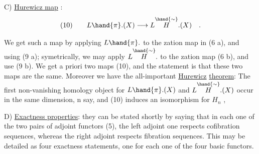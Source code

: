 C) \uline{Hurewicz map} :
\[
(10)\qquad L\hand{\pi}.(X) \longrightarrow L\overset{\hand{\sim}}{H}.(X) \quad .
\]

We get such a map by applying $L\hand{\pi}.$ to the zation map in
(6 a), and using (9 a); symetrically, we may apply $L\overset{\hand{\sim}}{H}.$ to the
zation map (6 b), and use (9 b). We get a priori two maps
(10), and the statement is that these two maps are the same. Moreover
we have the all-important \uline{Hurewicz} \uline{theorem}: The first non-vanishing
homology object for $L\hand{\pi}.(X)$ and $L\overset{\hand{\sim}}{H}.(X)$ occur in the same dimension, n
say, and (10) induces an isomorphism for $H_n$ , 

D) \uline{Exactness properties}: they can be stated shortly by saying that
in each one of the two pairs of adjoint functors (5), the left adjoint
one  respects cofibration sequences, whereas the right
adjoint respects fibration sequences. This may be detailed as four
exactness statements, one for each one of the four basic functors.


